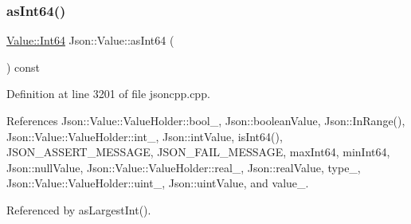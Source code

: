 \mbox{\label{class_json_1_1_value_aa647ac4fe51a2e325c063ebe32262b44}} 
\subsubsection{\texorpdfstring{as\+Int64()}{asInt64()}}
{\footnotesize\ttfamily \hyperlink{class_json_1_1_value_a1b86af9f85f0f1baa972c3319fa22695}{Value\+::\+Int64} Json\+::\+Value\+::as\+Int64 (\begin{DoxyParamCaption}{ }\end{DoxyParamCaption}) const}



Definition at line 3201 of file jsoncpp.\+cpp.



References Json\+::\+Value\+::\+Value\+Holder\+::bool\+\_\+, Json\+::boolean\+Value, Json\+::\+In\+Range(), Json\+::\+Value\+::\+Value\+Holder\+::int\+\_\+, Json\+::int\+Value, is\+Int64(), J\+S\+O\+N\+\_\+\+A\+S\+S\+E\+R\+T\+\_\+\+M\+E\+S\+S\+A\+GE, J\+S\+O\+N\+\_\+\+F\+A\+I\+L\+\_\+\+M\+E\+S\+S\+A\+GE, max\+Int64, min\+Int64, Json\+::null\+Value, Json\+::\+Value\+::\+Value\+Holder\+::real\+\_\+, Json\+::real\+Value, type\+\_\+, Json\+::\+Value\+::\+Value\+Holder\+::uint\+\_\+, Json\+::uint\+Value, and value\+\_\+.



Referenced by as\+Largest\+Int().


